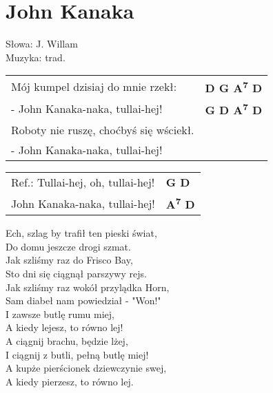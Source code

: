 \section{John Kanaka}

Słowa: J. Willam\\
Muzyka:  trad.

\vspace{2em}
\begin{tabular}{@{}p{7cm}@{}l@{}}
Mój kumpel dzisiaj do mnie rzekł: & \bfseries  D G A\textsuperscript{7} D \\
- John Kanaka-naka, tullai-hej! & \bfseries  G D A\textsuperscript{7} D \\
Roboty nie ruszę, choćbyś się wściekł. \\
- John Kanaka-naka, tullai-hej! \\
\end{tabular}

\vspace{1em}
\begin{tabular}{@{}p{7cm}@{}l@{}}
Ref.: Tullai-hej, oh, tullai-hej! & \bfseries  G D \\
John Kanaka-naka, tullai-hej! & \bfseries  A\textsuperscript{7} D \\
\end{tabular}

\vspace{1em}
Ech, szlag by trafił ten pieski świat, \\
Do domu jeszcze drogi szmat. \\

Jak szliśmy raz do Frisco Bay, \\
Sto dni się ciągnął parszywy rejs. \\

Jak szliśmy raz wokół przylądka Horn, \\
Sam diabeł nam powiedział - "Won!" \\

I zawsze butlę rumu miej, \\
A kiedy lejesz, to równo lej! \\

A ciągnij brachu, będzie lżej, \\
I ciągnij z butli, pełną butlę miej! \\

A kupże pierścionek dziewczynie swej, \\
A kiedy pierzesz, to równo lej. \\